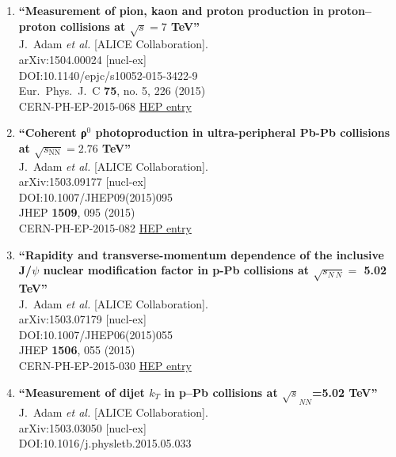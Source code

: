 \begin{enumerate}
\item%
{\bf ``Measurement of pion, kaon and proton production in proton–proton collisions at $\sqrt{s} = 7$ TeV''}
  \\{}J.~Adam {\it et al.} [ALICE Collaboration].
  \\{}arXiv:1504.00024 [nucl-ex]
  \\{}DOI:10.1140/epjc/s10052-015-3422-9
  \\{}Eur.\ Phys.\ J.\ C {\bf 75}, no. 5, 226 (2015)
  \\{}CERN-PH-EP-2015-068
\href{http://inspirehep.net/record/1357424}{HEP entry}
\item%
{\bf ``Coherent ρ$^{0}$ photoproduction in ultra-peripheral Pb-Pb collisions at $ \sqrt{s_{\mathrm{NN}}}=2.76 $ TeV''}
  \\{}J.~Adam {\it et al.} [ALICE Collaboration].
  \\{}arXiv:1503.09177 [nucl-ex]
  \\{}DOI:10.1007/JHEP09(2015)095
  \\{}JHEP {\bf 1509}, 095 (2015)
  \\{}CERN-PH-EP-2015-082
\href{http://inspirehep.net/record/1357206}{HEP entry}
\item%
{\bf ``Rapidity and transverse-momentum dependence of the inclusive J/$\psi$ nuclear modification factor in p-Pb collisions at $ \sqrt{s_{N\ N}} =$ 5.02 TeV''}
  \\{}J.~Adam {\it et al.} [ALICE Collaboration].
  \\{}arXiv:1503.07179 [nucl-ex]
  \\{}DOI:10.1007/JHEP06(2015)055
  \\{}JHEP {\bf 1506}, 055 (2015)
  \\{}CERN-PH-EP-2015-030
\href{http://inspirehep.net/record/1355544}{HEP entry}
\item%
{\bf ``Measurement of dijet $k_T$ in p–Pb collisions at $\sqrt{s}_{NN}$=5.02 TeV''}
  \\{}J.~Adam {\it et al.} [ALICE Collaboration].
  \\{}arXiv:1503.03050 [nucl-ex]
  \\{}DOI:10.1016/j.physletb.2015.05.033

\end{enumerate}
